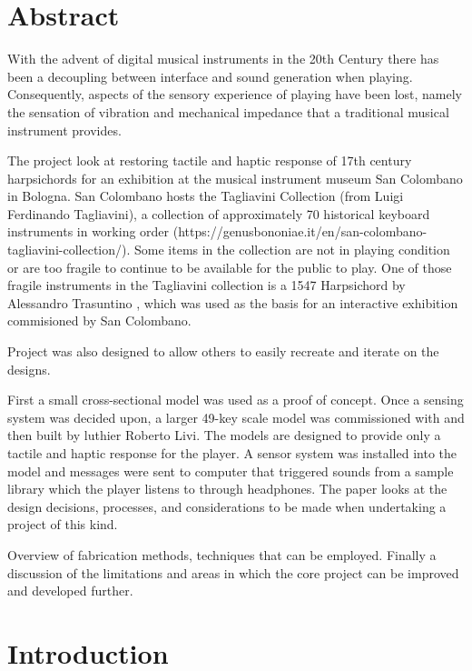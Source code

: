 \section{Abstract}\label{abstract}

With the advent of digital musical instruments in the 20th Century there
has been a decoupling between interface and sound generation when
playing. Consequently, aspects of the sensory experience of playing have
been lost, namely the sensation of vibration and mechanical impedance
that a traditional musical instrument provides.

The project look at restoring tactile and haptic response of 17th
century harpsichords for an exhibition at the musical instrument museum
San Colombano in Bologna. San Colombano hosts the Tagliavini Collection
(from Luigi Ferdinando Tagliavini), a collection of approximately 70
historical keyboard instruments in working order \cite{Tagliavini2009}
(https://genusbononiae.it/en/san-colombano-tagliavini-collection/). Some
items in the collection are not in playing condition or are too fragile
to continue to be available for the public to play. One of those fragile
instruments in the Tagliavini collection is a 1547 Harpsichord by
Alessandro Trasuntino \cite{Treccani2019}, which was used as the basis
for an interactive exhibition commisioned by San Colombano.

Project was also designed to allow others to easily recreate and iterate
on the designs.

First a small cross-sectional model was used as a proof of concept. Once
a sensing system was decided upon, a larger 49-key scale model was
commissioned with and then built by luthier Roberto Livi. The models are
designed to provide only a tactile and haptic response for the player. A
sensor system was installed into the model and messages were sent to
computer that triggered sounds from a sample library which the player
listens to through headphones. The paper looks at the design decisions,
processes, and considerations to be made when undertaking a project of
this kind.

Overview of fabrication methods, techniques that can be employed.
Finally a discussion of the limitations and areas in which the core
project can be improved and developed further.

\section{Introduction}\label{introduction}

